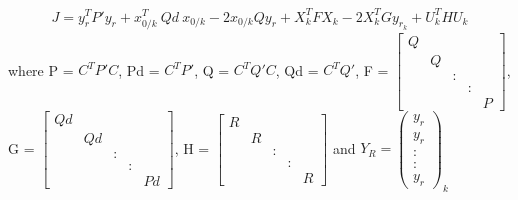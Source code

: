 \documentclass[french]{article}
\begin{document}
\begin{align}
	J = y_r^TP'y_r + x_{0/k}^T~ Qd~ x_{0/k} - 2 x_{0/k} Q y_r + X_k^T F X_k - 2 X_k^T G y_{r_k} + U_k^T H U_k
	\label{eq:costfunction}
\end{align}
where P = $C^TP'C$, Pd = $C^TP'$, Q = $C^TQ'C$, Qd = $C^TQ'$, F = $\begin{bmatrix}
Q &  &  &  &  \\ 
& Q &  &  &  \\ 
&  & : &  &  \\ 
&  &  & : &  \\ 
&  &  &  & P
\end{bmatrix} $, G = $\begin{bmatrix}
	Qd &  &  &  &  \\ 
	& Qd &  &  &  \\ 
	&  & : &  &  \\ 
	&  &  & : &  \\ 
	&  &  &  & Pd
\end{bmatrix} $, H = $\begin{bmatrix}
R &  &  &  &  \\ 
& R &  &  &  \\ 
&  & : &  &  \\ 
&  &  & : &  \\ 
&  &  &  & R
\end{bmatrix} $ and $Y_R =  \begin{pmatrix}
	y_r \\ 
	y_r \\ 
	: \\ 
	: \\ 
	y_r
\end{pmatrix}_k$
\end{document}
